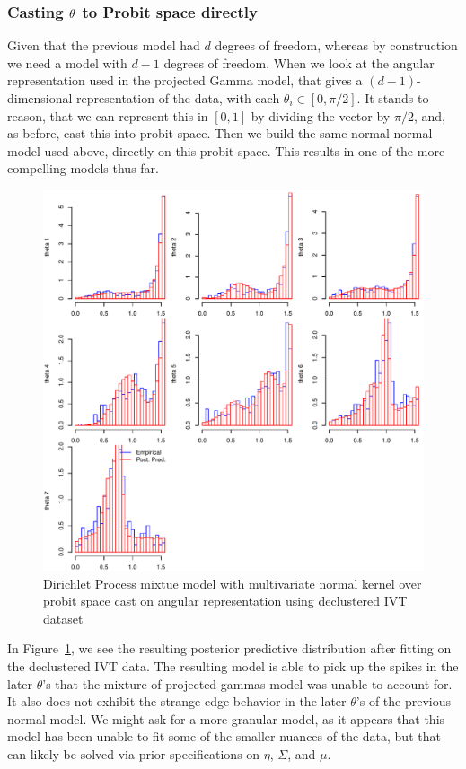 \subsubsection{Casting ${\bf \theta}$ to Probit space directly}
\label{method:npprobitnorm2}

Given that the previous model had $d$ degrees of freedom, whereas by construction we need a model
  with $d-1$ degrees of freedom.  When we look at the angular representation used in the projected
  Gamma model, that gives a $(d-1)$-dimensional representation of the data, with each
  $\theta_i \in [0,\pi/2]$. It stands to reason, that we can represent this in $[0,1]$ by dividing
  the vector by $\pi/2$, and, as before, cast this into probit space.  Then we build the same
  normal-normal model used above, directly on this probit space.  This results in one of the more
  compelling models thus far.

\begin{figure}[h!]
  \label{fig:dpnormal2}
  \centering
  \caption{Dirichlet Process mixtue model with multivariate normal kernel over probit space cast
            on angular representation using declustered IVT dataset}
  \includegraphics[width=6in]{./images/dpmp2_emp_v_pred_decluster}
\end{figure}

In Figure~\ref{fig:dpnormal2}, we see the resulting posterior predictive distribution after fitting
  on the declustered IVT data.  The resulting model is able to pick up the spikes in the later
  $\theta$'s that the mixture of projected gammas model was unable to account for.  It also does
  not exhibit the strange edge behavior in the later $\theta$'s of the previous normal model.  We
  might ask for a more granular model, as it appears that this model has been unable to fit some of
  the smaller nuances of the data, but that can likely be solved via prior specifications on $\eta$,
  $\Sigma$, and $\mu$.


